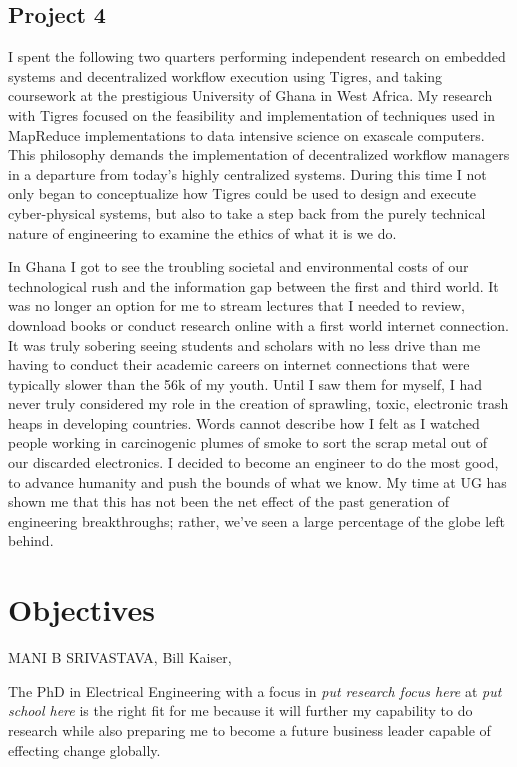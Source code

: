 \documentclass[journal, draftcls]{IEEEtran}
\begin{document}
\subsection{Project 4}
 I spent the following two quarters performing independent research on embedded systems and decentralized workflow execution using Tigres, and taking coursework at the prestigious University of Ghana in West Africa. My research with Tigres  focused on the feasibility and implementation of techniques used in MapReduce implementations to data intensive science on exascale computers. This philosophy demands the implementation of decentralized workflow managers in a departure from today's highly centralized systems. During this time I not only began to conceptualize how Tigres could be used to design and execute cyber-physical systems, but also to take a step back from the purely technical nature of engineering to examine the ethics of what it is we do. 
 
 In Ghana I got to see the troubling societal and environmental costs of our technological rush and the information gap between the first and third world. It was no longer an option for me to stream lectures that I needed to review, download books or conduct research online with a first world internet connection. It was truly sobering seeing students and scholars with no less drive than me having to conduct their academic careers on internet connections that were typically slower than the 56k of my youth. Until I saw them for myself, I had never truly considered my role in the creation of sprawling, toxic, electronic trash heaps in developing countries. Words cannot describe how I felt as I watched people working in carcinogenic plumes of smoke to sort the scrap metal out of our discarded electronics. I decided to become an engineer to do the most good, to advance humanity and push the bounds of what we know. My time at UG has shown me that this has not been the net effect of the past generation of engineering breakthroughs; rather, we've seen a large percentage of the globe left behind. 

\section{Objectives}
MANI B SRIVASTAVA,
Bill Kaiser,

	
The PhD in Electrical Engineering with a focus in \textit{{put research focus here}} at \textit{{put school here}} is the right fit for me because it will further my capability to do research while also preparing me to become a future business leader capable of effecting change globally. 
\end{document}
